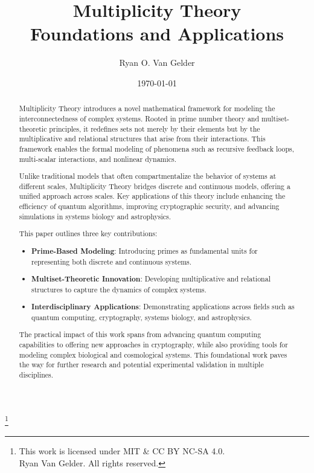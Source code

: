 \documentclass[%
 preprint, linenumbers,
 amsmath,amssymb,
 aps, physrev,
]{revtex4-2}
\begin{document}

\title{\textbf{Multiplicity Theory \\ Foundations and Applications} 
}%


\author{Ryan O. Van Gelder}
%
\thanks{This work is licensed under MIT & CC BY NC-SA 4.0. \\  Ryan Van Gelder. All rights reserved.}
\date{\today}%

\begin{abstract}
Multiplicity Theory introduces a novel mathematical framework for modeling the interconnectedness of complex systems. Rooted in prime number theory and multiset-theoretic principles, it redefines sets not merely by their elements but by the multiplicative and relational structures that arise from their interactions. This framework enables the formal modeling of phenomena such as recursive feedback loops, multi-scalar interactions, and nonlinear dynamics.

Unlike traditional models that often compartmentalize the behavior of systems at different scales, Multiplicity Theory bridges discrete and continuous models, offering a unified approach across scales. Key applications of this theory include enhancing the efficiency of quantum algorithms, improving cryptographic security, and advancing simulations in systems biology and astrophysics.

This paper outlines three key contributions:
\begin{itemize}
    \item \textbf{Prime-Based Modeling}: Introducing primes as fundamental units for representing both discrete and continuous systems.
    \item \textbf{Multiset-Theoretic Innovation}: Developing multiplicative and relational structures to capture the dynamics of complex systems.
    \item \textbf{Interdisciplinary Applications}: Demonstrating applications across fields such as quantum computing, cryptography, systems biology, and astrophysics.
\end{itemize}

The practical impact of this work spans from advancing quantum computing capabilities to offering new approaches in cryptography, while also providing tools for modeling complex biological and cosmological systems. This foundational work paves the way for further research and potential experimental validation in multiple disciplines.
\end{abstract}
\end{document}
